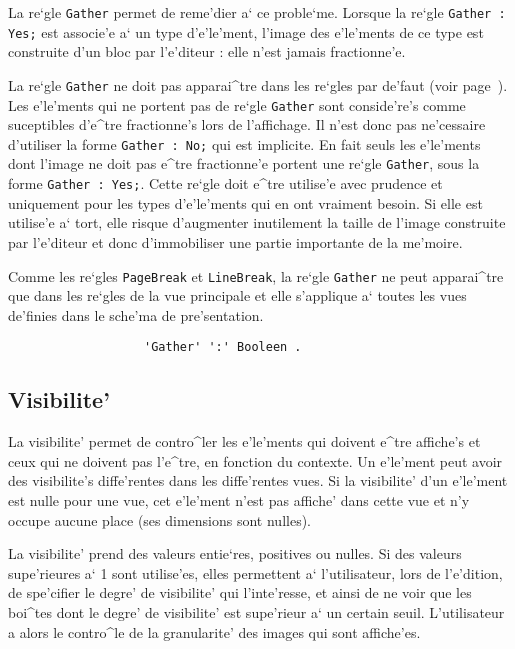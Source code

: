 {La re`gle {\tt Gather} permet de reme'dier a` ce proble`me. Lorsque la re`gle
{\tt Gather : Yes;} est associe'e a` un type d'e'le'ment, l'image des e'le'ments
de ce type est construite d'un bloc par l'e'diteur : elle n'est jamais
fractionne'e.

La re`gle {\tt Gather} ne doit pas apparai^tre dans les re`gles par de'faut
(voir page~\pageref{reglesdefaut}).
Les e'le'ments qui ne portent pas de re`gle {\tt Gather} sont conside're's comme
suceptibles d'e^tre fractionne's lors de l'affichage. Il n'est donc pas
ne'cessaire d'utiliser la forme {\tt Gather : No;} qui est implicite.
En fait seuls les e'le'ments dont l'image ne doit pas e^tre fractionne'e
portent une re`gle {\tt Gather}, sous la forme {\tt Gather : Yes;}. Cette
re`gle doit e^tre utilise'e avec prudence et uniquement pour les types
d'e'le'ments qui en ont vraiment besoin. Si elle est utilise'e a` tort, elle
risque d'augmenter inutilement la taille de l'image construite par l'e'diteur
et donc d'immobiliser une partie importante de la me'moire.

Comme les re`gles {\tt PageBreak} et {\tt LineBreak}, la re`gle {\tt Gather}
ne peut apparai^tre que dans les re`gles de la vue principale et elle
s'applique a` toutes les vues de'finies dans le sche'ma de pre'sentation.

\begin{verbatim}
                   'Gather' ':' Booleen .
\end{verbatim}

\subsection{Visibilite'}
\label{visib}

La visibilite' permet de contro^ler les e'le'ments qui doivent e^tre affiche's
et ceux qui ne doivent pas l'e^tre, en fonction du contexte. Un e'le'ment peut
avoir des visibilite's diffe'rentes dans les diffe'rentes vues. Si la visibilite'
d'un e'le'ment est nulle pour une vue, cet e'le'ment n'est pas affiche' dans cette
vue et n'y occupe aucune place (ses dimensions sont nulles).

La visibilite' prend des valeurs entie`res, positives ou nulles. Si des valeurs
supe'rieures a` 1 sont utilise'es, elles permettent a` l'utilisateur, lors
de l'e'dition, de spe'cifier le degre' de visibilite' qui l'inte'resse, et ainsi
de ne voir que les boi^tes dont le degre' de visibilite' est supe'rieur a` un
certain seuil. L'utilisateur a alors le contro^le de la granularite' des
images qui sont affiche'es.

}
